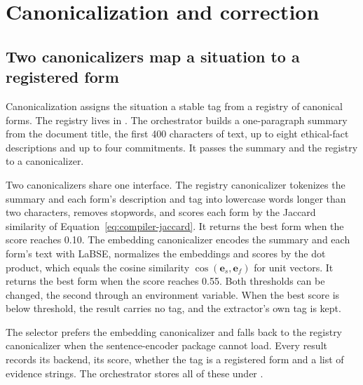 \section{Canonicalization and correction}\label{sec:compiler-canon}

\subsection{Two canonicalizers map a situation to a registered form}

Canonicalization assigns the situation a stable tag from a registry of canonical forms. The
registry lives in . The orchestrator builds a one-paragraph
summary from the document title, the first 400 characters of text, up to eight ethical-fact
descriptions and up to four commitments. It passes the summary and the registry to a
canonicalizer.

Two canonicalizers share one interface. The registry canonicalizer tokenizes the summary and each
form's description and tag into lowercase words longer than two characters, removes stopwords, and
scores each form by the Jaccard similarity of Equation~\eqref{eq:compiler-jaccard}. It returns the
best form when the score reaches 0.10. The embedding canonicalizer encodes the summary and each
form's text with LaBSE, normalizes the embeddings and scores by the dot product, which equals the
cosine similarity $\cos(\mathbf{e}_s, \mathbf{e}_f)$ for unit vectors. It returns the best form
when the score reaches 0.55. Both thresholds can be changed, the second through an environment
variable. When the best score is below threshold, the result carries no tag, and the extractor's
own tag is kept.

The selector  prefers the embedding canonicalizer and falls back to the
registry canonicalizer when the sentence-encoder package cannot load. Every result records its
backend, its score, whether the tag is a registered form and a list of evidence strings. The
orchestrator stores all of these under .

